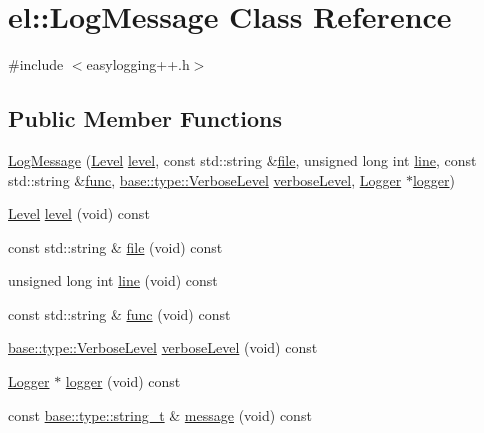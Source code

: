 \hypertarget{classel_1_1_log_message}{}\section{el\+:\+:Log\+Message Class Reference}
\label{classel_1_1_log_message}


{\ttfamily \#include $<$easylogging++.\+h$>$}

\subsection*{Public Member Functions}
\begin{DoxyCompactItemize}
\item 
\hyperlink{classel_1_1_log_message_a6cb875167d28c57e11877f833d733e04}{Log\+Message} (\hyperlink{namespaceel_ab0ac6091262344c52dd2d3ad099e8e36}{Level} \hyperlink{classel_1_1_log_message_a09514a3bb7deae447c3141bc55b52d06}{level}, const std\+::string \&\hyperlink{classel_1_1_log_message_a8f72164d7bf31ea3b15a5c0201fca0c4}{file}, unsigned long int \hyperlink{classel_1_1_log_message_a4bc97e6670d890cae719e3e9680b8373}{line}, const std\+::string \&\hyperlink{classel_1_1_log_message_ae09cdff5620dcf8269b2b83bea722a2a}{func}, \hyperlink{namespaceel_1_1base_1_1type_a3f79fa74639a13c32f794ba074fe7fb4}{base\+::type\+::\+Verbose\+Level} \hyperlink{classel_1_1_log_message_a52e91b0dd3e5af96642622cc2a67aa88}{verbose\+Level}, \hyperlink{classel_1_1_logger}{Logger} $\ast$\hyperlink{classel_1_1_log_message_ae67b30a16a4115148ee32c9b2c91e03c}{logger})
\item 
\hyperlink{namespaceel_ab0ac6091262344c52dd2d3ad099e8e36}{Level} \hyperlink{classel_1_1_log_message_a09514a3bb7deae447c3141bc55b52d06}{level} (void) const 
\item 
const std\+::string \& \hyperlink{classel_1_1_log_message_a8f72164d7bf31ea3b15a5c0201fca0c4}{file} (void) const 
\item 
unsigned long int \hyperlink{classel_1_1_log_message_a4bc97e6670d890cae719e3e9680b8373}{line} (void) const 
\item 
const std\+::string \& \hyperlink{classel_1_1_log_message_ae09cdff5620dcf8269b2b83bea722a2a}{func} (void) const 
\item 
\hyperlink{namespaceel_1_1base_1_1type_a3f79fa74639a13c32f794ba074fe7fb4}{base\+::type\+::\+Verbose\+Level} \hyperlink{classel_1_1_log_message_a52e91b0dd3e5af96642622cc2a67aa88}{verbose\+Level} (void) const 
\item 
\hyperlink{classel_1_1_logger}{Logger} $\ast$ \hyperlink{classel_1_1_log_message_ae67b30a16a4115148ee32c9b2c91e03c}{logger} (void) const 
\item 
const \hyperlink{namespaceel_1_1base_1_1type_a67e406cd213c231f1d135b5a4eda64b5}{base\+::type\+::string\+\_\+t} \& \hyperlink{classel_1_1_log_message_a0f34882ed8102061bb9bb247cb08a5c3}{message} (void) const 
\end{DoxyCompactItemize}


